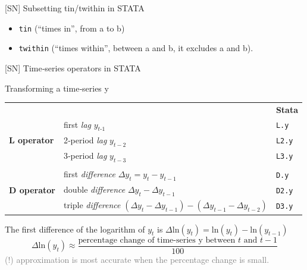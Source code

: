 \documentclass[
  10pt,
  ignorenonframetext,
]{beamer}
\providecommand{\tightlist}{%
  \setlength{\itemsep}{0pt}\setlength{\parskip}{0pt}}
\begin{document}
\begin{frame}[fragile]{{[}SN{]} Subsetting tin/twithin in STATA}
\protect\hypertarget{sn-subsetting-tintwithin-in-stata}{}
\begin{itemize}
\tightlist
\item
  \texttt{tin} (``times in'', from a to b)
\end{itemize}

\vspace{1mm}

\begin{itemize}
\tightlist
\item
  \texttt{twithin} (``times within'', between a and b, it excludes a and
  b).
\end{itemize}
\end{frame}

\begin{frame}{{[}SN{]} Time‐series operators in STATA}
\protect\hypertarget{sn-timeseries-operators-in-stata}{}
\begin{table}[]
Transforming a time‐series y
\begin{tabular}{lll}
& & \textbf{Stata}\\
\multirow{3}{*}{\textbf{L operator}} & first \textit{lag} $y_{t‐1}$                              & \texttt{L{\color{lightgray}{1}}.y}  \\
                            & 2‐period \textit{lag} $y_{t-2}$                                    & \texttt{L2.y}  \\
                            & 3‐period \textit{lag} $y_{t-3}$                                    & \texttt{L3.y}  \\
                            \\
\multirow{3}{*}{\textbf{D operator}} & first \textit{difference} $\Delta y_t = y_t - y_{t-1}$ & \texttt{D{\color{lightgray}{1}}.y}  \\
                            & double \textit{difference} $\Delta y_t - \Delta y_{t-1}$ & \texttt{D2.y}  \\
                            & triple \textit{difference} $(\Delta y_t - \Delta y_{t-1}) - (\Delta y_{t-1} - \Delta y_{t-2})$ & \texttt{D3.y}  \\
\end{tabular}
\end{table}

\vspace{3mm}

The first difference of the logarithm of \(y_t\) is
\(\Delta \text{ln}(y_t) = \text{ln}(y_t) - \text{ln}(y_{t-1})\) \[
\Delta \text{ln}(y_t) \approx \frac{\text{percentage change of time-series y between } t \text{ and } t-1}{100}
\]
\footnotesize \textcolor{gray}{(!) approximation is most accurate when the percentage change is small.}
\end{frame}
\end{document}
